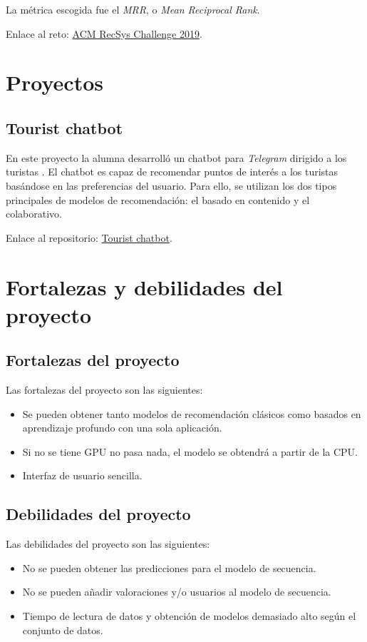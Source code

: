 La métrica escogida fue el \textit{MRR}, o \textit{Mean Reciprocal Rank}.

Enlace al reto: \href{http://www.recsyschallenge.com/2019/}{ACM RecSys Challenge 2019}.

\section{Proyectos}\label{proyectos}
\subsection{Tourist chatbot}\label{chatbot}
En este proyecto la alumna desarrolló un chatbot para \textit{Telegram} dirigido a los turistas \cite{chatbot}. El chatbot es capaz de recomendar puntos de interés a los turistas basándose en las preferencias del usuario. Para ello, se utilizan los dos tipos principales de modelos de recomendación: el basado en contenido y el colaborativo.

Enlace al repositorio: \href{https://github.com/jaswellnitz/tourist-chatbot}{Tourist chatbot}.

\section{Fortalezas y debilidades del proyecto}\label{fortalezas-debilidades}
\subsection{Fortalezas del proyecto}\label{fortalezas}
Las fortalezas del proyecto son las siguientes:
\begin{itemize}
\tightlist
\item Se pueden obtener tanto modelos de recomendación clásicos como basados en aprendizaje profundo con una sola aplicación.
\item Si no se tiene GPU no pasa nada, el modelo se obtendrá a partir de la CPU.
\item Interfaz de usuario sencilla.
\end{itemize}

\subsection{Debilidades del proyecto}\label{debilidades}
Las debilidades del proyecto son las siguientes:
\begin{itemize}
\tightlist
\item No se pueden obtener las predicciones para el modelo de secuencia.
\item No se pueden añadir valoraciones y/o usuarios al modelo de secuencia.
\item Tiempo de lectura de datos y obtención de modelos demasiado alto según el conjunto de datos.
\end{itemize}
